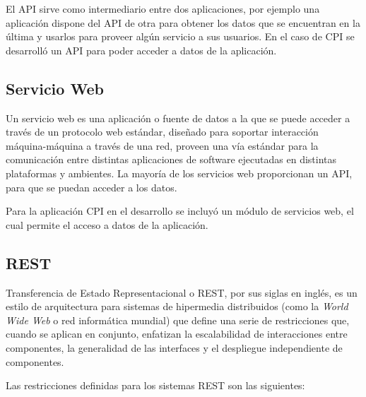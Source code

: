 El API sirve como intermediario entre dos aplicaciones, por ejemplo una aplicación dispone del API de otra para obtener los datos que se encuentran en la última y usarlos para proveer algún servicio a sus usuarios. En el caso de CPI se desarrolló un API para poder acceder a datos de la aplicación.

\subsection{Servicio Web}
Un servicio web es una aplicación o fuente de datos a la que se puede acceder a través de un protocolo web estándar, diseñado para soportar interacción máquina-máquina a través de una red, proveen una vía estándar para la comunicación entre distintas aplicaciones de software ejecutadas en distintas plataformas y ambientes. La mayoría de los servicios web proporcionan un API, para que se puedan acceder a los datos. \cite{webServiceChristensson}

Para la aplicación CPI en el desarrollo se incluyó un módulo de servicios web, el cual permite el acceso a datos de la aplicación.

\subsection{REST}
Transferencia de Estado Representacional o REST, por sus siglas en inglés, es un estilo de arquitectura para sistemas de hipermedia distribuidos (como la \textit{World Wide Web} o red informática mundial) que define una serie de restricciones que, cuando se aplican en conjunto, enfatizan la escalabilidad de interacciones entre componentes, la generalidad de las interfaces y el despliegue independiente de componentes. \cite{restFielding}

Las restricciones definidas para los sistemas REST son las siguientes:


